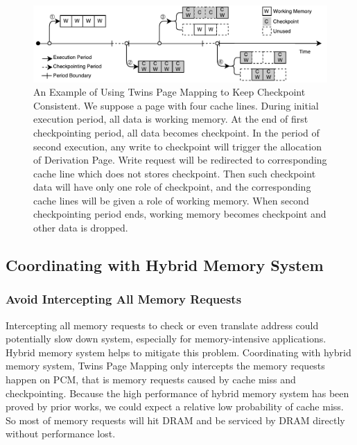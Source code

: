 \documentclass[conference]{IEEEtran}
\newcommand*\circled[1]{\raisebox{.5pt}{\textcircled{\raisebox{-.9pt} {#1}}}}
\begin{document}

\begin{figure}
    \includegraphics[width=\columnwidth]{page_mapping_example}
    \caption{An Example of Using Twins Page Mapping to Keep Checkpoint Consistent.
        We suppose a page with four cache lines.
        \circled{1} During initial execution period, all data is working memory.
        \circled{2} At the end of first checkpointing period, all data becomes checkpoint.
        \circled{3} In the period of second execution, any write to checkpoint will trigger the allocation of Derivation Page.
            Write request will be redirected to corresponding cache line which does not stores checkpoint.
            Then such checkpoint data will have only one role of checkpoint, and the corresponding cache lines will be given a role of working memory.
        \circled{4} When second checkpointing period ends, working memory becomes checkpoint and other data is dropped.
    }
\label{fig:page_mapping_example}
\end{figure}

\subsection{Coordinating with Hybrid Memory System}

\subsubsection{Avoid Intercepting All Memory Requests}

Intercepting all memory requests to check or even translate address could potentially slow down system, especially for memory-intensive applications.
Hybrid memory system helps to mitigate this problem.
Coordinating with hybrid memory system, Twins Page Mapping only intercepts the memory requests happen on PCM, that is memory requests caused by cache miss and checkpointing.
Because the high performance of hybrid memory system has been proved by prior works, we could expect a relative low probability of cache miss.
So most of memory requests will hit DRAM and be serviced by DRAM directly without performance lost.
\end{document}
